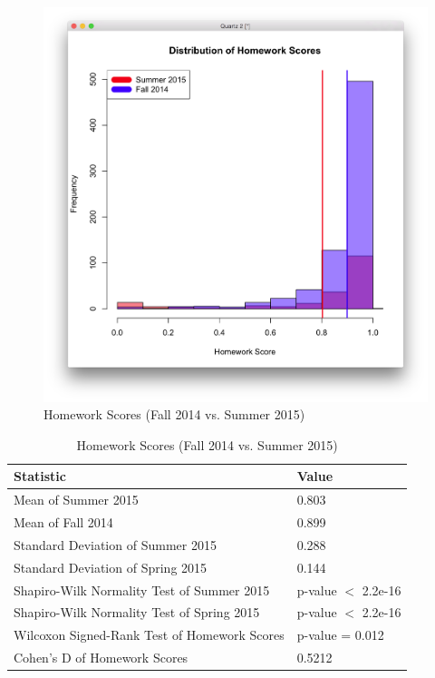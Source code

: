 \begin{figure}
	\centering
	\includegraphics[width=6in]{img/chapter4/hw_su15_vs_f14}
	\caption[Homework Scores (Fall 2014 vs. Summer 2015)]{Homework Scores (Fall 2014 vs. Summer 2015)}
  \label{fig:hwSu14Su15}
\end{figure}

\begin{small}
\begin{table}
  \centering
  \begin{tabular}{|l|l|}
    \hline
    \textbf{Statistic} & \textbf{Value} \\
	\hline
	Mean of Summer 2015 & 0.803 \\
	\hline
	Mean of Fall 2014 & 0.899 \\
	\hline
	Standard Deviation of Summer 2015 & 0.288 \\
	\hline
	Standard Deviation of Spring 2015 & 0.144 \\
	\hline
	Shapiro-Wilk Normality Test of Summer 2015 & p-value $<$ 2.2e-16 \\
	\hline
	Shapiro-Wilk Normality Test of Spring 2015 & p-value $<$ 2.2e-16 \\
	\hline
	Wilcoxon Signed-Rank Test of Homework Scores & p-value = 0.012 \\
	\hline
	Cohen's D of Homework Scores & 0.5212 \\
	\hline
  \end{tabular}
	\caption[Homework Scores (Fall 2014 vs. Summer 2015)]{Homework Scores (Fall 2014 vs. Summer 2015)}
  \label{fig:hwSu14Su15}
\end{table}
\end{small}

